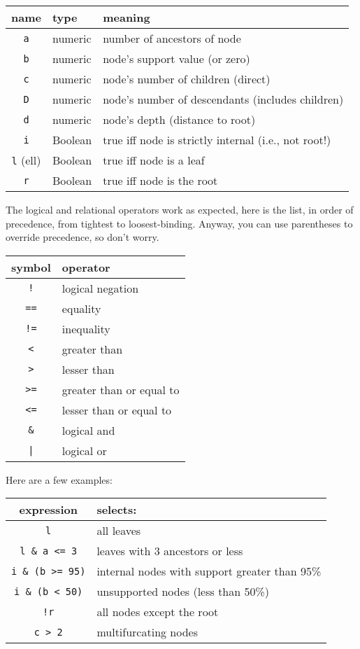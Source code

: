 \begin{center}
\begin{tabular}{cll}
name & type & meaning \\
\hline
\texttt{a} & numeric & number of ancestors of node	 \\
\texttt{b} & numeric & node's support value (or zero) \\
\texttt{c} & numeric & node's number of children (direct) \\
\texttt{D} & numeric & node's number of descendants (includes children) \\
\texttt{d} & numeric & node's depth (distance to root) \\
\texttt{i} & Boolean & true iff node is strictly internal (i.e., not root!) \\
\texttt{l} (ell) & Boolean & true iff node is a leaf \\
\texttt{r} & Boolean & true iff node is the root
\end{tabular}
\end{center}

The logical and relational operators work as expected, here is the list, in
order of precedence, from tightest to loosest-binding.  Anyway, you can use
parentheses to override precedence, so don't worry.

\begin{center}
\begin{tabular}{cl}
symbol & operator \\
\hline
\texttt{!} & logical negation \\
\hline
\texttt{==} & equality \\
\texttt{!=} & inequality \\
\texttt{<} & greater than \\
\texttt{>} & lesser than \\
\texttt{>=} & greater than or equal to \\
\texttt{<=} & lesser than or equal to \\
\hline
\texttt{\&} & logical and \\
\hline
\texttt{|} & logical or
\end{tabular}
\end{center}

\noindent{}Here are a few examples:

\begin{center}
\begin{tabular}{cl}
expression & selects: \\
\hline
\texttt{l} & all leaves \\
\texttt{l \& a <= 3} & leaves with 3 ancestors or less \\
\texttt{i \& (b >= 95)} & internal nodes with support greater than 95\% \\ 
\texttt{i \& (b < 50)} & unsupported nodes (less than 50\%) \\
\texttt{!r} & all nodes except the root \\
\texttt{c > 2} & multifurcating nodes
\end{tabular}
\end{center}


